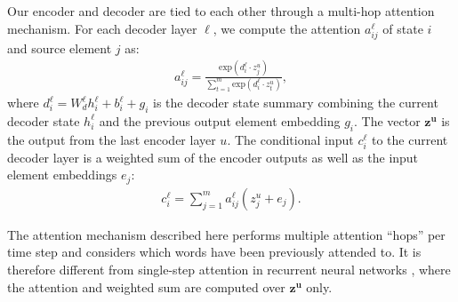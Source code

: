Our encoder and decoder are tied to each other through a multi-hop
attention mechanism\cite{luong2015effective, vaswani2017attention}. For each decoder layer $\ell$, we compute the
attention $a^{\ell}_{ij}$ of state $i$ and source element $j$ as:
\begin{align}
a^{\ell}_{ij} = \frac{\mbox{exp}(d^{\ell}_i \cdot z^u_j)}{\sum^m_{t=1} \mbox{exp}(d^{\ell}_i \cdot z^u_t)}, \label{eq:attention}
\end{align}
\noindent where $d^{\ell}_i = W^{\ell}_dh^{\ell}_i+b^{\ell}_i+g_i$ is
the decoder state summary combining the current decoder state
$h^{\ell}_i$ and the previous output element embedding $g_i$. The
vector $\mathbf{z^u}$ is the output from the last encoder layer
$u$. The conditional input $c^{\ell}_i$ to the current decoder layer
is a weighted sum of the encoder outputs as well as the input element
embeddings $e_j$:
\begin{align}
c^{\ell}_i = \sum^m_{j=1} a^{\ell}_{ij}(z^u_j+e_j). \label{eq:decinput}
\end{align}

The attention mechanism described here performs multiple attention
``hops'' per time step and considers which words have been previously
attended to. It is therefore different from single-step attention in
recurrent neural networks \cite{bahdanau2014neural}, where the attention
and weighted sum are computed over $\mathbf{z^u}$ only.
